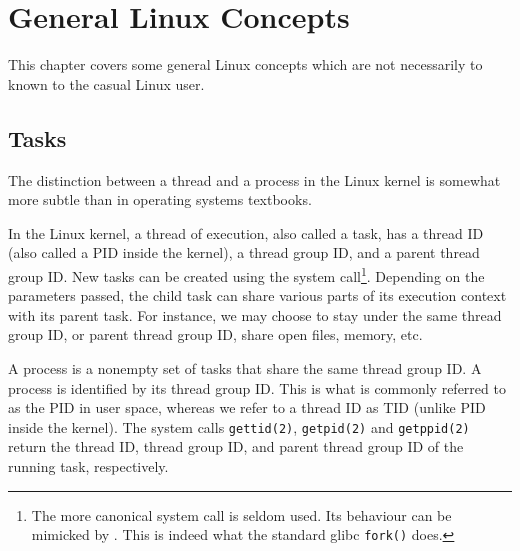 
\chapter{General Linux Concepts}

This chapter covers some general Linux concepts which are not necessarily to
known to the casual Linux user.

\section{Tasks}

\label{appendix:general-linux-concepts:tasks}

The distinction between a thread and a process in the Linux kernel is somewhat
more subtle than in operating systems textbooks.

In the Linux kernel, a thread of execution, also called a task, has a thread ID
(also called a PID inside the kernel), a thread group ID, and a parent thread
group ID. New tasks can be created using the \cite{man-2-clone} system
call\footnote{The more canonical \cite{man-2-fork} system call is seldom used.
Its behaviour can be mimicked by \cite{man-2-clone}. This is indeed what the
standard glibc \texttt{fork()} does.}. Depending on the parameters passed, the
child task can share various parts of its execution context with its parent
task. For instance, we may choose to stay under the same thread group ID, or
parent thread group ID, share open files, memory, etc.

A process is a nonempty set of tasks that share the same thread group ID. A
process is identified by its thread group ID. This is what is commonly referred
to as the PID in user space, whereas we refer to a thread ID as TID (unlike PID
inside the kernel). The system calls \texttt{gettid(2)}, \texttt{getpid(2)} and
\texttt{getppid(2)} return the thread ID, thread group ID, and parent thread
group ID of the running task, respectively.
